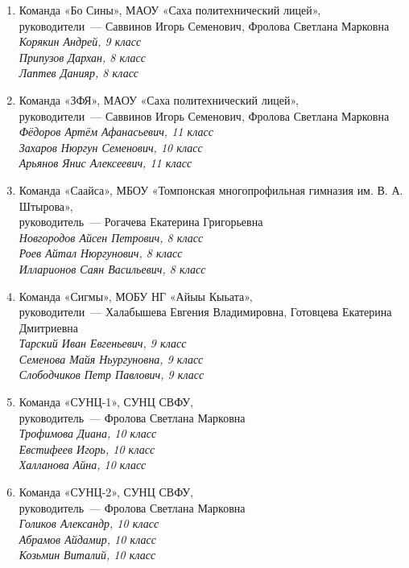 \begin{enumerate}
\item Команда «Бо Сины», МАОУ «Саха политехнический лицей», \\
руководители~— Саввинов Игорь Семенович, Фролова Светлана Марковна \\
\it
\indent Корякин Андрей, 9 класс \\
\indent Припузов Дархан, 8 класс \\
\indent Лаптев Данияр, 8 класс
\rm

\item Команда «ЗФЯ», МАОУ «Саха политехнический лицей», \\
руководители~— Саввинов Игорь Семенович, Фролова Светлана Марковна \\
\it
\indent Фёдоров Артём Афанасьевич, 11 класс \\
\indent Захаров Нюргун Семенович, 10 класс \\
\indent Арьянов Янис Алексеевич, 11 класс
\rm

\item Команда «Саайса», МБОУ «Томпонская многопрофильная гимназия им. В. А. Штырова», \\
руководитель~— Рогачева Екатерина Григорьевна \\
\it
\indent Новгородов Айсен Петрович, 8 класс \\
\indent Роев Айтал Нюргунович, 8 класс \\
\indent Илларионов Саян Васильевич, 8 класс
\rm

\item Команда «Сигмы», МОБУ НГ «Айыы Кыьата», \\
руководители~— Халабышева Евгения Владимировна, Готовцева Екатерина Дмитриевна \\
\it
\indent Тарский Иван Евгеньевич, 9 класс \\
\indent Семенова Майя Ньургуновна, 9 класс \\
\indent Слободчиков Петр Павлович, 9 класс
\rm

\item Команда «СУНЦ-1», СУНЦ СВФУ, \\
руководитель~— Фролова Светлана Марковна\\
\it
\indent Трофимова Диана, 10 класс \\
\indent Евстифеев Игорь, 10 класс \\
\indent Халланова Айна, 10 класс
\rm

\item Команда «СУНЦ-2», СУНЦ СВФУ, \\
руководитель~— Фролова Светлана Марковна\\
\it
\indent Голиков Александр, 10 класс \\
\indent Абрамов Айдамир, 10 класс \\
\indent Козьмин Виталий, 10 класс
\rm


\end{enumerate}
